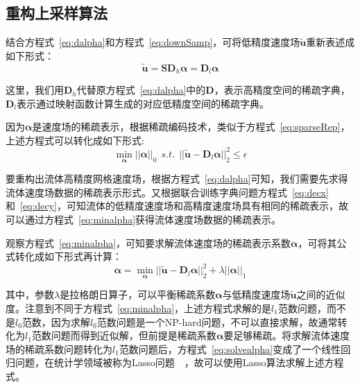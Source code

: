 \subsection{重构上采样算法}

结合方程式~\ref{eq:dalpha}和方程式~\ref{eq:downSamp}，可将低精度速度场$\tilde {\boldsymbol u}$重新表述成如下形式：
\begin{equation}
\label{eq:decompose}
\tilde {\boldsymbol u} = \boldsymbol {SD}_h{\boldsymbol \alpha} = \boldsymbol D_l \boldsymbol \alpha
\end{equation}

这里，我们用$\boldsymbol D_h$代替原方程式~\ref{eq:dalpha}中的$\boldsymbol D$，表示高精度空间的稀疏字典，$\boldsymbol D_l$表示通过映射函数计算生成的对应低精度空间的稀疏字典。

因为$\boldsymbol \alpha$是速度场的稀疏表示，根据稀疏编码技术，类似于方程式~\ref{eq:sparseRep}，上述方程式可以转化成如下形式:
\begin{equation}
\label{eq:minalpha}
\min_{\boldsymbol \alpha}||\boldsymbol \alpha||_0 \ \ s.t. \ \ ||\tilde {\boldsymbol u} - \boldsymbol D_l \boldsymbol \alpha||_2^2 \leq \epsilon
\end{equation}

要重构出流体高精度网格速度场，根据方程式~\ref{eq:dalpha}可知，我们需要先求得流体速度场数据的稀疏表示形式。又根据联合训练字典问题方程式~\ref{eq:decx}和~\ref{eq:decy}，可知流体的低精度速度场和高精度速度场具有相同的稀疏表示，故可以通过方程式~\ref{eq:minalpha}获得流体速度场数据的稀疏表示。

观察方程式~\ref{eq:minalpha}，可知要求解流体速度场的稀疏表示系数$\boldsymbol \alpha$，可将其公式转化成如下形式再计算：
\begin{equation}
\label{eq:solvealpha}
\boldsymbol \alpha= \min_{\boldsymbol \alpha} || \boldsymbol {\tilde u} - \boldsymbol D_l \boldsymbol \alpha||_2^2 + \lambda ||\boldsymbol \alpha||_1
\end{equation}

其中，参数$\lambda$是拉格朗日算子，可以平衡稀疏系数$\boldsymbol \alpha$与低精度速度场$\tilde {\boldsymbol u}$之间的近似度。注意到不同于方程式~\ref{eq:minalpha}，上述方程式求解的是$l_1$范数问题，而不是$l_0$范数，因为求解$l_0$范数问题是一个NP-hard问题，不可以直接求解，故通常转化为$l_1$范数问题而得到近似解，但前提是稀疏系数$\boldsymbol \alpha$要足够稀疏。将求解流体速度场的稀疏系数问题转化为$l_1$范数问题后，方程式~\ref{eq:solvealpha}变成了一个线性回归问题，在统计学领域被称为Lasso问题~\cite{efron2004least}~\cite{tibshirani1996regression}，故可以使用Lasso算法求解上述方程式。

